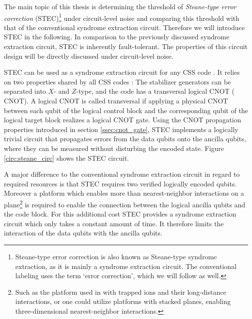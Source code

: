 The main topic of this thesis is determining the threshold of \emph{Steane-type error correction} (STEC)\footnote{
    Steane-type error correction is also known as Steane-type syndrome extraction, as it is mainly a syndrome extraction circuit. 
    The conventional labeling uses the term `error correction', which we will follow as well. 
} \cite{steane_type_EC_og_paper} under circuit-level noise 
and comparing this threshold with that of the conventional syndrome extraction circuit.
Therefore we will introduce STEC in the following.
In comparison to the previously discussed syndrome extraction circuit, STEC is inherently fault-tolerant.
The properties of this circuit design will be directly discussed under circuit-level noise. 

STEC can be used as a syndrome extraction circuit for any CSS code \cite{gottesmann_book}.
It relies on two properties shared by all CSS codes \cite{CSS1,CSS2}:
The stabilizer generators can be separated into $X$- and $Z$-type, and the code has a transversal logical CNOT ($\overline{\text{CNOT}}$).
A logical CNOT is called transversal if applying a physical CNOT between each qubit of the logical control block 
and the corresponding qubit of the logical target block realizes a logical CNOT gate. 
Using the CNOT propagation properties introduced in section \ref{ssec:cnot_gate}, 
STEC implements a logically trivial circuit that propagates errors from the data qubits onto the ancilla qubits, 
where they can be measured without disturbing the encoded state.
Figure \ref{circ:steane_circ} shows the STEC circuit.

A major difference to the conventional syndrome extraction circuit in regard to required resources is that STEC requires two verified logically encoded qubits.
Moreover a platform which enables more than nearest-neighbor interactions on a plane\footnote{
    Such as the platform used in \cite{friederike_steane} with trapped ions and their long-distance interactions, or one could utilize platforms with stacked planes, enabling three-dimensional nearest-neighbor interactions.
} is required to enable the connection between the logical ancilla qubits and the code block.
For this additional cost STEC provides a syndrome extraction circuit which only takes a constant amount of time. 
It therefore limits the interaction of the data qubits with the ancilla qubits.

